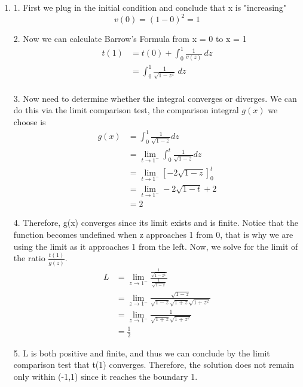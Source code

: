 \documentclass[12pt]{article}
\begin{document}
\begin{enumerate}
  \item [(a)]

        1. First we plug in the initial condition and conclude that x is "increasing"
        \[
          v(0) = (1-0)^2 = 1
        \]

        2. Now we can calculate Barrow's Formula from x = 0 to x = 1
        \begin{align*}
          t(1) & = t(0) + \int^1_0{\frac{1}{v(z)} ~ dz}  \\
               & = \int^1_0{\frac{1}{\sqrt{1-z^4}} ~ dz} \\
        \end{align*}

        3. Now need to determine whether the integral converges or diverges. We can do this via the limit comparison test, the comparison integral $g(x)$ we choose is
        \begin{align*}
          g(x) & = \int^1_0{\frac{1}{\sqrt{1-z}} dz}                           \\
               & = \lim_{t\rightarrow{1^{-}}}\int^t_0{\frac{1}{\sqrt{1-z}} dz} \\
               & = \lim_{t\rightarrow{1^{-}}}[-2\sqrt{1-z}]^t_0                \\
               & = \lim_{t\rightarrow{1^{-}}} -2\sqrt{1-t} + 2                 \\
               & = 2
        \end{align*}

        4. Therefore, g(x) converges since its limit exists and is finite. Notice that the function becomes undefined when z approaches 1 from 0, that is why we are using the limit as it approaches 1 from the left. Now, we solve for the limit of the ratio $\frac{t(1)}{g(z)}$.
        \begin{align*}
          L & = \lim_{z\rightarrow{1^{-}}}\frac{\frac{1}{\sqrt{1-z^4}}}{\frac{1}{\sqrt{1-z}}}  \\
            & =  \lim_{z\rightarrow{1^{-}}}\frac{\sqrt{1-z}}{\sqrt{1-z}\sqrt{1+z}\sqrt{1+z^2}} \\
            & =                    \lim_{z\rightarrow{1^{-}}}\frac{1}{\sqrt{1+z}\sqrt{1+z^2}}  \\
            & = \frac{1}{2}
        \end{align*}

        5. L is both positive and finite, and thus we can conclude by the limit comparison test that t(1) converges. Therefore, the solution does not remain only within (-1,1) since it reaches the boundary 1.


\end{enumerate}
\end{document}
